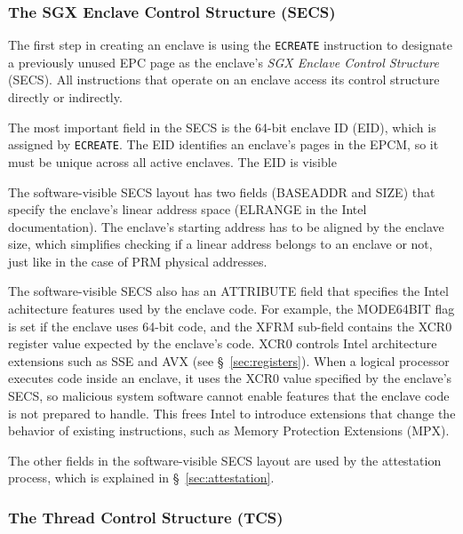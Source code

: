 \subsubsection{The SGX Enclave Control Structure (SECS)}
\label{sec:secs}


The first step in creating an enclave is using the \texttt{ECREATE} instruction
to designate a previously unused EPC page as the enclave's \textit{SGX Enclave
Control Structure} (SECS). All instructions that operate on an enclave access
its control structure directly or indirectly.

The most important field in the SECS is the 64-bit enclave ID (EID), which is
assigned by \texttt{ECREATE}. The EID identifies an enclave's pages in the
EPCM, so it must be unique across all active enclaves. The EID is visible

The software-visible SECS layout has two fields (BASEADDR and SIZE) that
specify the enclave's linear address space (ELRANGE in the Intel
documentation). The enclave's starting address has to be aligned by the enclave
size, which simplifies checking if a linear address belongs to an enclave or
not, just like in the case of PRM physical addresses.


The software-visible SECS also has an ATTRIBUTE field that specifies the Intel
achitecture features used by the enclave code. For example, the MODE64BIT flag
is set if the enclave uses 64-bit code, and the XFRM sub-field contains the
XCR0 register value expected by the enclave's code. XCR0 controls Intel
architecture extensions such as SSE and AVX (see \S~\ref{sec:registers}). When
a logical processor executes code inside an enclave, it uses the XCR0 value
specified by the enclave's SECS, so malicious system software cannot enable
features that the enclave code is not prepared to handle. This frees Intel to
introduce extensions that change the behavior of existing instructions, such as
Memory Protection Extensions (MPX).

The other fields in the software-visible SECS layout are used by the
attestation process, which is explained in \S~\ref{sec:attestation}.

\subsubsection{The Thread Control Structure (TCS)}
\label{sec:tcs}


